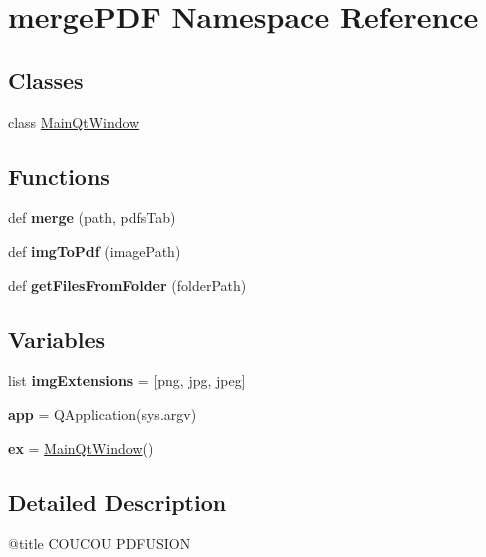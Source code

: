 \hypertarget{namespacemergePDF}{}\section{merge\+P\+DF Namespace Reference}
\label{namespacemergePDF}
\subsection*{Classes}
\begin{DoxyCompactItemize}
\item 
class \hyperlink{classmergePDF_1_1MainQtWindow}{Main\+Qt\+Window}
\end{DoxyCompactItemize}
\subsection*{Functions}
\begin{DoxyCompactItemize}
\item 
\mbox{\label{namespacemergePDF_a1993b6356fb1a09df169091085d52197}} 
def {\bfseries merge} (path, pdfs\+Tab)
\item 
\mbox{\label{namespacemergePDF_a5d5648750de68cbac9ff82196e3c3ce8}} 
def {\bfseries img\+To\+Pdf} (image\+Path)
\item 
\mbox{\label{namespacemergePDF_ab02c63c5896ab65a896deabb19dc2d05}} 
def {\bfseries get\+Files\+From\+Folder} (folder\+Path)
\end{DoxyCompactItemize}
\subsection*{Variables}
\begin{DoxyCompactItemize}
\item 
\mbox{\label{namespacemergePDF_a9cf4919fefb7206919c3369661d4e2d2}} 
list {\bfseries img\+Extensions} = \mbox{[}\textquotesingle{}png\textquotesingle{}, \textquotesingle{}jpg\textquotesingle{}, \textquotesingle{}jpeg\textquotesingle{}\mbox{]}
\item 
\mbox{\label{namespacemergePDF_ada56b81ef4ca16723581a7cd6e1388bd}} 
{\bfseries app} = Q\+Application(sys.\+argv)
\item 
\mbox{\label{namespacemergePDF_a6ed7cb3abf91dad632a94bdb6369127a}} 
{\bfseries ex} = \hyperlink{classmergePDF_1_1MainQtWindow}{Main\+Qt\+Window}()
\end{DoxyCompactItemize}


\subsection{Detailed Description}
\begin{DoxyVerb}@title COUCOU PDFUSION\end{DoxyVerb}
 